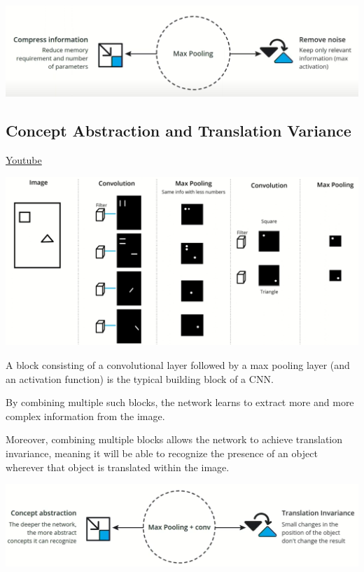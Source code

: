 \includegraphics[width=1\linewidth]{img//cnn//concepts/maxpooling.png}

\subsection{Concept Abstraction and Translation Variance}
\href{https://www.youtube.com/watch?v=3cz1zZbS4ko&ab_channel=Udacity}{Youtube} \newline

\includegraphics[width=1\linewidth]{img//cnn//concepts/image7.png}

A block consisting of a convolutional layer followed by a max pooling layer (and an activation function) is the typical building block of a CNN. \newline

By combining multiple such blocks, the network learns to extract more and more complex information from the image. \newline

Moreover, combining multiple blocks allows the network to achieve translation invariance, meaning it will be able to recognize the presence of an object wherever that object is translated within the image.

\includegraphics[width=1\linewidth]{img//cnn//concepts/image8.png}

